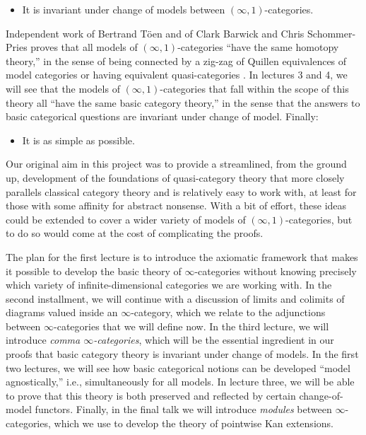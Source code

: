 \documentclass[12pt,reqno]{amsart}
\theoremstyle{plain}
\theoremstyle{definition}
\theoremstyle{remark}
\numberwithin{equation}{subsection}
\begin{document}
\begin{itemize}
\item It is invariant under change of models between $(\infty,1)$-categories.%
\end{itemize}
Independent work of Bertrand T\"{o}en and of Clark Barwick and Chris Schommer-Pries proves that all models of $(\infty,1)$-categories ``have the same homotopy theory,'' in the sense of being connected by a zig-zag of Quillen equivalences of model categories  \cite{Toen:2005vu}  or having equivalent quasi-categories  \cite{BSP:2011ot}. In lectures 3 and 4, we will see that the models of $(\infty,1)$-categories that fall within the scope of this theory all ``have the same basic category theory,'' in the sense that the answers to basic categorical questions are invariant under change of model. Finally:
\begin{itemize}
\item It is as simple as possible.
\end{itemize}
Our original aim in this project was to provide a streamlined, from the ground up, development of the foundations of quasi-category theory that more closely parallels classical category theory and is relatively easy to work with, at least for those with some affinity for abstract nonsense. With a bit of effort, these ideas could be extended to cover  a wider variety of models of $(\infty,1)$-categories, but to do so would come at the cost of complicating the proofs. 

The plan for the first lecture is to introduce the axiomatic framework that makes it possible to develop the basic theory of $\infty$-categories without knowing precisely which variety of infinite-dimensional categories we are working with. In the second installment, we will continue with a discussion of limits and colimits of diagrams valued inside an $\infty$-category, which we relate to the adjunctions between $\infty$-categories that we will define now. In the third lecture, we will introduce \emph{comma $\infty$-categories}, which will be the essential ingredient in our proofs that basic category theory  is invariant under change of models. In the first two lectures, we will see how basic categorical notions can be developed ``model agnostically,'' i.e., simultaneously for all models. In lecture three, we will be able to prove that this theory is both preserved and reflected by certain change-of-model functors. Finally, in the final talk we will introduce \emph{modules} between $\infty$-categories, which we use to develop the theory of pointwise Kan extensions.
\end{document}
